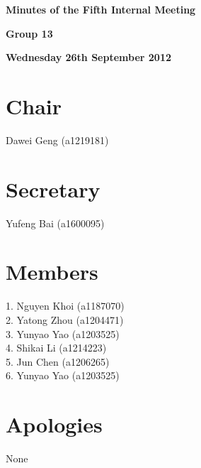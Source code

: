 \documentclass[11pt, a4paper]{article}
\begin{document}
 



\vspace*{15pt}

\begin{center}
\huge \bf Minutes of the Fifth Internal Meeting
\end{center}


\begin{center}
\Large \bf Group 13
\end{center}

\begin{center}
\Large \bf  Wednesday 26th September 2012
\end{center}

\section*{Chair}
 Dawei Geng (a1219181)

\section*{Secretary}
Yufeng Bai (a1600095)

\section*{Members}
1. Nguyen Khoi (a1187070)\\
2. Yatong Zhou (a1204471)\\
3. Yunyao Yao (a1203525)\\
4. Shikai Li (a1214223)\\
5. Jun Chen (a1206265)\\
6. Yunyao Yao (a1203525)
\vspace*{10pt}

\section*{Apologies}
None
\end{document}
